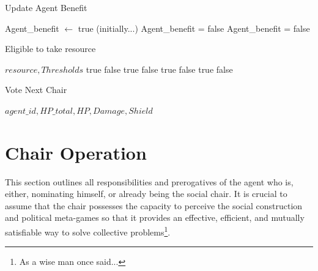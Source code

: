 \begin{algorithm}
\caption{Update Agent Benefit}
\begin{algorithmic}
\State Agent\_benefit $\leftarrow$ true (initially...)
\State Agent\_benefit = false
\EndIf
{}
\State Agent\_benefit = false
\EndIf
\end{algorithmic}
\end{algorithm}


\begin{algorithm}
\caption{Eligible to take resource}
\begin{algorithmic}
\Require $resource,Thresholds$
\State
\Return true
\Else
\State
\Return false
\EndIf
\EndIf
{}
\State
\Return true
\Else
\State
\Return false
\EndIf
\EndIf
{}
\State
\Return true
\Else
\State
\Return false
\EndIf
\EndIf
{}
\State
\Return true
\Else
\State
\Return false
\EndIf
\EndIf
\end{algorithmic}
\end{algorithm}

\begin{algorithm}
\caption{Vote Next Chair}
\begin{algorithmic}
\Require $agent\_id, HP\_total, HP, Damage, Shield$

\end{algorithmic}
\end{algorithm}


\clearpage
\section{Chair Operation}

This section outlines all responsibilities and prerogatives of the agent who is, either, nominating himself, or already being the social chair. It is crucial to assume that the chair possesses the capacity to perceive the social construction and political meta-games so that it provides an effective, efficient, and mutually satisfiable way to solve collective problems\footnote {As a wise man once said...}.

